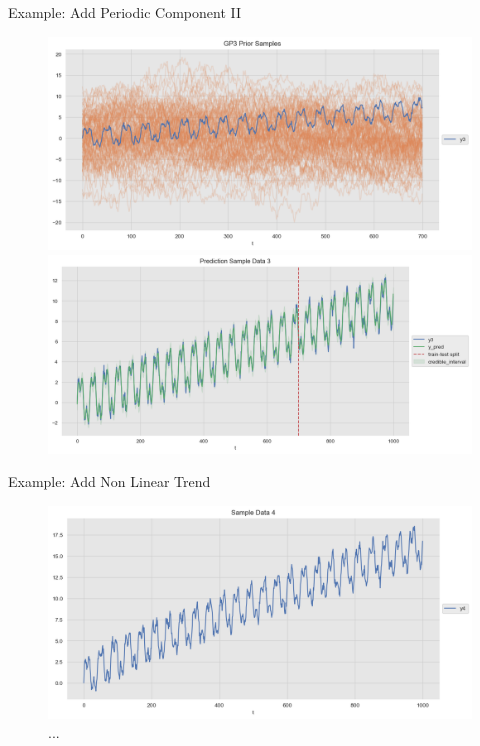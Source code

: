 \documentclass[10pt]{beamer}
\begin{document}
\begin{frame}{Example: Add Periodic Component II }
\begin{center}
\begin{figure}
\includegraphics[scale=0.30]{images/gaussian_process_time_series_files/gaussian_process_time_series_63_0.png}
\includegraphics[scale=0.30]{images/gaussian_process_time_series_files/gaussian_process_time_series_68_0.png}
\end{figure}
\end{center}
\end{frame}

\begin{frame}{Example: Add Non Linear Trend}
\begin{center}
\begin{figure}
\includegraphics[scale=0.4]{images/gaussian_process_time_series_files/gaussian_process_time_series_76_0.png} 
\caption{ ...  }
\end{figure}
\end{center}
\end{frame}
\end{document}
